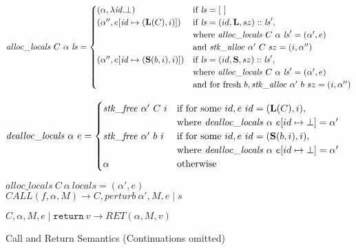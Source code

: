 \documentclass{article}
\begin{document}
\begin{figure}
  \[\mathit{alloc\_locals} ~ C ~ \alpha ~ \mathit{ls} =
  \begin{cases}
    (\alpha, \lambda \mathit{id}. \bot) & \textnormal{if } \mathit{ls} = [~]\\
    (\alpha'', e[\mathit{id} \mapsto (\mathbf{L}(C),i)]) &
    \textnormal{if } \mathit{ls} = (id,\mathbf{L},sz)::\mathit{ls}',\\
    & \textnormal{where } \mathit{alloc\_locals} ~ C ~ \alpha ~ \mathit{ls}' =
    (\alpha', e) \\
    & \textnormal{and } \mathit{stk\_alloc} ~ \alpha' ~ C ~ sz = (i, \alpha'') \\
    (\alpha'', e[\mathit{id} \mapsto (\mathbf{S}(b,i),i)]) &
    \textnormal{if } \mathit{ls} = (id,\mathbf{S},sz)::\mathit{ls}',\\
    & \textnormal{where } \mathit{alloc\_locals} ~ C ~ \alpha ~ \mathit{ls}' =
    (\alpha', e) \\
    & \textnormal{and for fresh } b, \mathit{stk\_alloc} ~ \alpha' ~ b ~ sz = (i, \alpha'') \\
  \end{cases}\]

  \[\mathit{dealloc\_locals} ~ \alpha ~ e =
  \begin{cases}
    \mathit{stk\_free} ~ \alpha' ~ C ~ i &
    \textnormal{if for some } id, e ~ id = (\mathbf{L}(C),i),\\
    & \textnormal{where } \mathit{dealloc\_locals} ~ \alpha ~ e[id \mapsto \bot] =
    \alpha' \\
    \mathit{stk\_free} ~ \alpha' ~ b ~ i &
    \textnormal{if for some } id, e ~ id = (\mathbf{S}(b,i),i),\\
    & \textnormal{where } \mathit{dealloc\_locals} ~ \alpha ~ e[id \mapsto \bot] =
    \alpha' \\
    \alpha & \textnormal{otherwise} \\
  \end{cases}\]
  
              {\(\mathit{alloc\_locals} ~ C ~ \alpha ~ \mathit{locals} =
                (\alpha',e)\)}
              {\(\mathit{CALL}(f,\alpha,M) \longrightarrow
                C,\mathit{perturb} ~ \alpha',M,e \mid s\)}

           {\(C,\alpha,M,e \mid \mathtt{return} ~ v \longrightarrow
             \mathit{RET}(\alpha,M,v)\)}
           
  \caption{Call and Return Semantics (Continuations omitted)}
  \label{fig:callret}
\end{figure}
\end{document}
